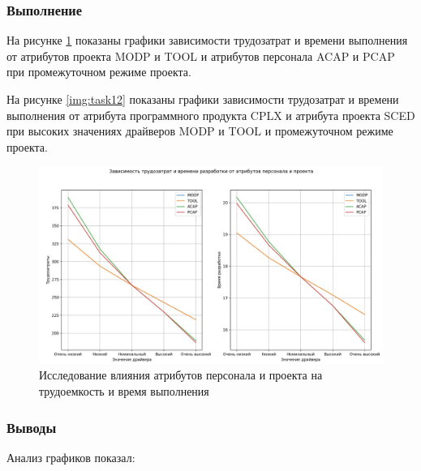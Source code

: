 \subsubsection*{Выполнение}

На рисунке \ref{img:task11} показаны графики зависимости трудозатрат и времени выполнения от атрибутов проекта MODP и TOOL и атрибутов персонала ACAP и PCAP при промежуточном режиме проекта.

На рисунке \ref{img:task12} показаны графики зависимости трудозатрат и времени выполнения от атрибута программного продукта CPLX и атрибута проекта SCED при высоких значениях драйверов MODP и TOOL и промежуточном режиме проекта.

\begin{figure}[H]
	\begin{center}
		\includegraphics[scale=0.19]{inc/img/task11.jpg}
	\end{center}
	\captionsetup{justification=centering}
	\caption{Исследование влияния атрибутов персонала и проекта на трудоемкость и время выполнения}
	\label{img:task11}
\end{figure}

\subsubsection*{Выводы}

Анализ графиков показал:

